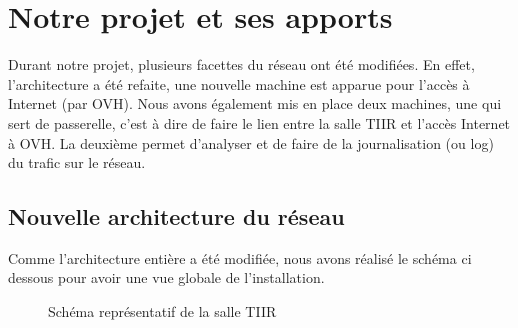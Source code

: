 \chapter{Notre projet et ses apports}
\label{sec:unchapitre}

Durant notre projet, plusieurs facettes du réseau ont été modifiées. En effet, l'architecture a été refaite, une nouvelle machine est apparue pour l'accès à Internet (par OVH). Nous avons également mis en place deux machines, une qui sert de passerelle, c'est à dire de faire le lien entre la salle TIIR et l'accès Internet à OVH. La deuxième permet d'analyser et de faire de la journalisation (ou log) du trafic sur le réseau.



\section{Nouvelle architecture du réseau}
Comme l'architecture entière a été modifiée, nous avons réalisé le schéma ci dessous pour avoir une vue globale de l'installation.\\
\begin{figure}
	\centering
	\def\svgwidth{\columnwidth}
	
	\caption{Schéma représentatif de la salle TIIR}
\end{figure}

